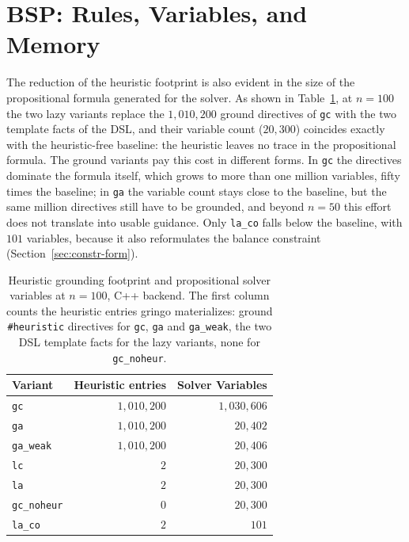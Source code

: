 \section{BSP: Rules, Variables, and Memory}
\label{sec:bsp-memory}

The reduction of the heuristic footprint is also evident in the size of the propositional formula generated for the solver. As shown in Table~\ref{tab:n100-vars}, at $n=100$ the two lazy variants replace the $1{,}010{,}200$ ground directives of \texttt{gc} with the two template facts of the DSL, and their variable count ($20{,}300$) coincides exactly with the heuristic-free baseline: the heuristic leaves no trace in the propositional formula. The ground variants pay this cost in different forms. In \texttt{gc} the directives dominate the formula itself, which grows to more than one million variables, fifty times the baseline; in \texttt{ga} the variable count stays close to the baseline, but the same million directives still have to be grounded, and beyond $n=50$ this effort does not translate into usable guidance. Only \texttt{la\_co} falls below the baseline, with $101$ variables, because it also reformulates the balance constraint (Section~\ref{sec:constr-form}).

\begin{table}[H]
\centering
\small
\begin{tabular}{lrr}
\toprule
\textbf{Variant} & \textbf{Heuristic entries} & \textbf{Solver Variables}\\
\midrule
\texttt{gc}        & $1{,}010{,}200$ & $1{,}030{,}606$\\
\texttt{ga}        & $1{,}010{,}200$ & $20{,}402$\\
\texttt{ga\_weak}   & $1{,}010{,}200$ & $20{,}406$\\
\texttt{lc}        & $2$             & $20{,}300$\\
\texttt{la}        & $2$             & $20{,}300$\\
\texttt{gc\_noheur} & $0$             & $20{,}300$\\
\texttt{la\_co}     & $2$             & $101$\\
\bottomrule
\end{tabular}
\caption{Heuristic grounding footprint and propositional solver variables at $n=100$, C++ backend. The first column counts the heuristic entries gringo materializes: ground \texttt{\#heuristic} directives for \texttt{gc}, \texttt{ga} and \texttt{ga\_weak}, the two DSL template facts for the lazy variants, none for \texttt{gc\_noheur}.}
\label{tab:n100-vars}
\end{table}

